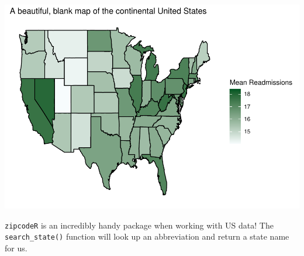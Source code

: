 \documentclass[
]{article}
\newenvironment{Shaded}{\begin{snugshade}}{\end{snugshade}}
\newcommand{\CommentTok}[1]{\textcolor[rgb]{0.56,0.35,0.01}{\textit{#1}}}
\begin{document}
\includegraphics{Demo3_files/figure-latex/unnamed-chunk-7-1.pdf}

\texttt{zipcodeR} is an incredibly handy package when working with US
data! The \texttt{search\_state()} function will look up an abbreviation
and return a state name for us.

\begin{Shaded}
\end{Shaded}
\end{document}
